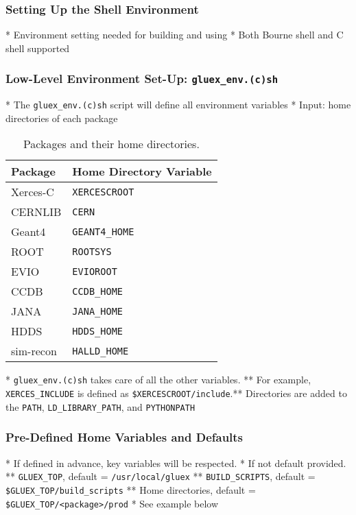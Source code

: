 \documentclass[xcolor=dvipsnames,hyperref={pdfpagelabels=false}]{beamer}
\begin{document}
\begin{frame}\frametitle{Setting Up the Shell Environment}

* Environment setting needed for building and using
* Both Bourne shell and C shell supported

\end{frame}\begin{frame}\frametitle{Low-Level Environment Set-Up: {\tt gluex\_env.(c)sh}}
\label{section:low-level-environment-setting}

* The {\tt gluex\_env.(c)sh} script will define all environment variables
* Input: home directories of each package

\begin{table}
\begin{center}
\begin{tabular}{|l|l|}
\hline
\bf Package & \bf Home Directory Variable \\
\hline Xerces-C & {\tt XERCESCROOT} \\
CERNLIB & {\tt CERN} \\
Geant4 & {\tt GEANT4\_HOME} \\
ROOT & {\tt ROOTSYS} \\
EVIO & {\tt EVIOROOT} \\
CCDB & {\tt CCDB\_HOME} \\
JANA & {\tt JANA\_HOME} \\
HDDS & {\tt HDDS\_HOME} \\
sim-recon & {\tt HALLD\_HOME} \\
\hline
\end{tabular}
\end{center}
\caption{Packages and their home directories.}\label{table:home-directories}
\end{table}

* {\tt gluex\_env.(c)sh} takes care of all the other variables.
** For example, {\tt XERCES\_INCLUDE} is defined as {\tt \$XERCESCROOT/include}.** Directories are added to the {\tt PATH}, {\tt LD\_LIBRARY\_PATH}, and {\tt PYTHONPATH}

\end{frame}\begin{frame}\frametitle{Pre-Defined Home Variables and Defaults}

* If defined in advance, key variables will be respected.
* If not default provided.
** {\tt GLUEX\_TOP}, default =  {\tt /usr/local/gluex}
** {\tt BUILD\_SCRIPTS}, default = {\tt \$GLUEX\_TOP/build\_scripts}
** Home directories, default = {\tt \$GLUEX\_TOP/<package>/prod}
* See example below


\end{frame}
\end{document}
